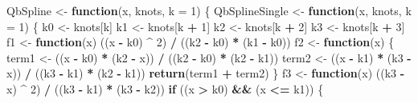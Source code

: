 \documentclass[
  12pt,
]{article}
\newenvironment{Shaded}{\begin{snugshade}}{\end{snugshade}}
\newcommand{\ControlFlowTok}[1]{\textcolor[rgb]{0.13,0.29,0.53}{\textbf{#1}}}
\newcommand{\DataTypeTok}[1]{\textcolor[rgb]{0.13,0.29,0.53}{#1}}
\newcommand{\DecValTok}[1]{\textcolor[rgb]{0.00,0.00,0.81}{#1}}
\newcommand{\KeywordTok}[1]{\textcolor[rgb]{0.13,0.29,0.53}{\textbf{#1}}}
\newcommand{\NormalTok}[1]{#1}
\newcommand{\OperatorTok}[1]{\textcolor[rgb]{0.81,0.36,0.00}{\textbf{#1}}}
\newcommand{\StringTok}[1]{\textcolor[rgb]{0.31,0.60,0.02}{#1}}
\begin{document}
\begin{Shaded}
\begin{Highlighting}[]
\NormalTok{QbSpline \textless{}{-}}\StringTok{ }\ControlFlowTok{function}\NormalTok{(x, knots, }\DataTypeTok{k =} \DecValTok{1}\NormalTok{) \{}
\NormalTok{  QbSplineSingle \textless{}{-}}\StringTok{ }\ControlFlowTok{function}\NormalTok{(x, knots, }\DataTypeTok{k =} \DecValTok{1}\NormalTok{) \{}
\NormalTok{    k0 \textless{}{-}}\StringTok{ }\NormalTok{knots[k]}
\NormalTok{    k1 \textless{}{-}}\StringTok{ }\NormalTok{knots[k }\OperatorTok{+}\StringTok{ }\DecValTok{1}\NormalTok{]}
\NormalTok{    k2 \textless{}{-}}\StringTok{ }\NormalTok{knots[k }\OperatorTok{+}\StringTok{ }\DecValTok{2}\NormalTok{]}
\NormalTok{    k3 \textless{}{-}}\StringTok{ }\NormalTok{knots[k }\OperatorTok{+}\StringTok{ }\DecValTok{3}\NormalTok{]}
\NormalTok{    f1 \textless{}{-}}\StringTok{ }\ControlFlowTok{function}\NormalTok{(x)}
\NormalTok{      ((x }\OperatorTok{{-}}\StringTok{ }\NormalTok{k0) }\OperatorTok{\^{}}\StringTok{ }\DecValTok{2}\NormalTok{) }\OperatorTok{/}\StringTok{ }\NormalTok{((k2 }\OperatorTok{{-}}\StringTok{ }\NormalTok{k0) }\OperatorTok{*}\StringTok{ }\NormalTok{(k1 }\OperatorTok{{-}}\StringTok{ }\NormalTok{k0))}
\NormalTok{    f2 \textless{}{-}}\StringTok{ }\ControlFlowTok{function}\NormalTok{(x) \{}
\NormalTok{      term1 \textless{}{-}}\StringTok{ }\NormalTok{((x }\OperatorTok{{-}}\StringTok{ }\NormalTok{k0) }\OperatorTok{*}\StringTok{ }\NormalTok{(k2 }\OperatorTok{{-}}\StringTok{ }\NormalTok{x)) }\OperatorTok{/}\StringTok{ }\NormalTok{((k2 }\OperatorTok{{-}}\StringTok{ }\NormalTok{k0) }\OperatorTok{*}\StringTok{ }\NormalTok{(k2 }\OperatorTok{{-}}\StringTok{ }\NormalTok{k1))}
\NormalTok{      term2 \textless{}{-}}\StringTok{ }\NormalTok{((x }\OperatorTok{{-}}\StringTok{ }\NormalTok{k1) }\OperatorTok{*}\StringTok{ }\NormalTok{(k3 }\OperatorTok{{-}}\StringTok{ }\NormalTok{x)) }\OperatorTok{/}\StringTok{ }\NormalTok{((k3 }\OperatorTok{{-}}\StringTok{ }\NormalTok{k1) }\OperatorTok{*}\StringTok{ }\NormalTok{(k2 }\OperatorTok{{-}}\StringTok{ }\NormalTok{k1))}
      \KeywordTok{return}\NormalTok{(term1 }\OperatorTok{+}\StringTok{ }\NormalTok{term2)}
\NormalTok{    \}}
\NormalTok{    f3 \textless{}{-}}\StringTok{ }\ControlFlowTok{function}\NormalTok{(x)}
\NormalTok{      ((k3 }\OperatorTok{{-}}\StringTok{ }\NormalTok{x) }\OperatorTok{\^{}}\StringTok{ }\DecValTok{2}\NormalTok{) }\OperatorTok{/}\StringTok{ }\NormalTok{((k3 }\OperatorTok{{-}}\StringTok{ }\NormalTok{k1) }\OperatorTok{*}\StringTok{ }\NormalTok{(k3 }\OperatorTok{{-}}\StringTok{ }\NormalTok{k2))}
    \ControlFlowTok{if}\NormalTok{ ((x }\OperatorTok{\textgreater{}}\StringTok{ }\NormalTok{k0) }\OperatorTok{\&\&}\StringTok{ }\NormalTok{(x }\OperatorTok{\textless{}=}\StringTok{ }\NormalTok{k1)) \{}

\end{Highlighting}
\end{Shaded}
\end{document}
